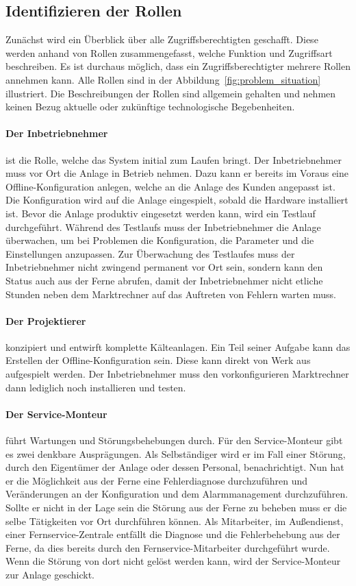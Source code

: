 \documentclass[11pt,a4paper]{report}
\begin{document}
\subsection{Identifizieren der Rollen} \label{sec:roles}

Zunächst wird ein Überblick über alle Zugriffsberechtigten geschafft. Diese werden anhand von Rollen zusammengefasst, welche Funktion und Zugriffsart beschreiben. Es ist durchaus möglich, dass ein Zugriffsberechtigter mehrere Rollen annehmen kann. Alle Rollen sind in der Abbildung~\ref{fig:problem_situation} illustriert. Die Beschreibungen der Rollen sind allgemein gehalten und nehmen keinen Bezug aktuelle oder zukünftige technologische Begebenheiten.

\paragraph{Der Inbetriebnehmer} ist die Rolle, welche das System initial zum Laufen bringt. Der Inbetriebnehmer muss vor Ort die Anlage in Betrieb nehmen. Dazu kann er bereits im Voraus eine Offline-Konfiguration anlegen, welche an die Anlage des Kunden angepasst ist. Die Konfiguration wird auf die Anlage eingespielt, sobald die Hardware installiert ist. Bevor die Anlage produktiv eingesetzt werden kann, wird ein Testlauf durchgeführt. Während des Testlaufs muss der Inbetriebnehmer die Anlage überwachen, um bei Problemen die Konfiguration, die Parameter und die Einstellungen anzupassen. Zur Überwachung des Testlaufes muss der Inbetriebnehmer nicht zwingend permanent vor Ort sein, sondern kann den Status auch aus der Ferne abrufen, damit der Inbetriebnehmer nicht etliche Stunden neben dem Marktrechner auf das Auftreten von Fehlern warten muss.

\paragraph{Der Projektierer} konzipiert und entwirft komplette Kälteanlagen. Ein Teil seiner Aufgabe kann das Erstellen der Offline-Konfiguration sein. Diese kann direkt von Werk aus aufgespielt werden. Der Inbetriebnehmer muss den vorkonfigurieren Marktrechner dann lediglich noch installieren und testen.

\paragraph{Der Service-Monteur} führt Wartungen und Störungsbehebungen durch. Für den Service-Monteur gibt es zwei denkbare Ausprägungen. Als Selbständiger wird er im Fall einer Störung, durch den Eigentümer der Anlage oder dessen Personal, benachrichtigt. Nun hat er die Möglichkeit aus der Ferne eine Fehlerdiagnose durchzuführen und Veränderungen an der Konfiguration und dem Alarmmanagement durchzuführen. Sollte er nicht in der Lage sein die Störung aus der Ferne zu beheben muss er die selbe Tätigkeiten vor Ort durchführen können. Als Mitarbeiter, im Außendienst, einer Fernservice-Zentrale entfällt die Diagnose und die Fehlerbehebung aus der Ferne, da dies bereits durch den Fernservice-Mitarbeiter durchgeführt wurde. Wenn die Störung von dort nicht gelöst werden kann, wird der Service-Monteur zur Anlage geschickt.
\end{document}
